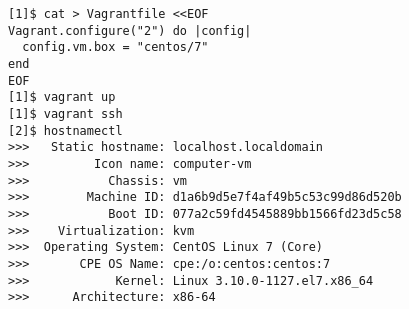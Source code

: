 \begin{lstfloat}
\begin{lstlisting}[style=mybashstyle,
caption={Ukázka nastavení prostředí},
label={sample:vm}
]
[1]$ cat > Vagrantfile <<EOF
Vagrant.configure("2") do |config|
  config.vm.box = "centos/7"
end
EOF
[1]$ vagrant up
[1]$ vagrant ssh
[2]$ hostnamectl
>>>   Static hostname: localhost.localdomain
>>>         Icon name: computer-vm
>>>           Chassis: vm
>>>        Machine ID: d1a6b9d5e7f4af49b5c53c99d86d520b
>>>           Boot ID: 077a2c59fd4545889bb1566fd23d5c58
>>>    Virtualization: kvm
>>>  Operating System: CentOS Linux 7 (Core)
>>>       CPE OS Name: cpe:/o:centos:centos:7
>>>            Kernel: Linux 3.10.0-1127.el7.x86_64
>>>      Architecture: x86-64
\end{lstlisting}
\end{lstfloat}